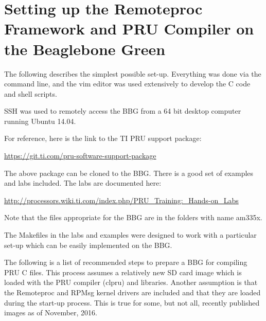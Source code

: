 %
%
%

\chapter{Setting up the Remoteproc Framework and PRU Compiler on the Beaglebone Green}

The following describes the simplest possible set-up.  Everything was done via the command line, and the vim editor was used extensively to develop the C code and shell scripts.

SSH was used to remotely access the BBG from a 64 bit desktop computer running Ubuntu 14.04.

For reference, here is the link to the TI PRU support package:

\url{https://git.ti.com/pru-software-support-package}

The above package can be cloned to the BBG.  There is a good set of examples and labs included.  The labs are documented here:

\url{http://processors.wiki.ti.com/index.php/PRU_Training:_Hands-on_Labs}

Note that the files appropriate for the BBG are in the folders with name am335x.

The Makefiles in the labs and examples were designed to work with a particular set-up which can be easily implemented on the BBG.

The following is a list of recommended steps to prepare a BBG for compiling PRU C files.
This process assumes a relatively new SD card image which is loaded with the PRU compiler (clpru) and libraries.  Another assumption is that the Remoteproc and RPMsg kernel drivers are included and that they are loaded during the start-up process.  This is true for some, but not all, recently published images as of November, 2016.

